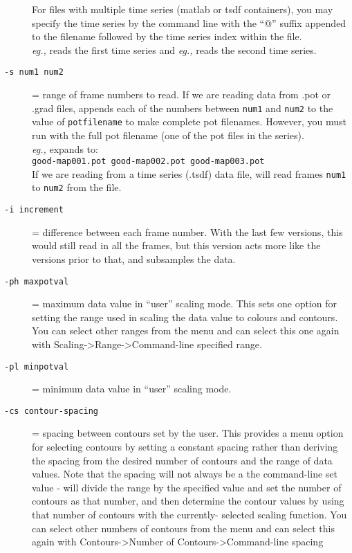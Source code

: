 \begin{description}
    For files with multiple time series (matlab or tsdf containers),
    you may specify the time series by the command line with the ``@'' 
    suffix appended to the filename followed by the time series index 
    within the file. \\

    {\em eg.,} \hspace{.2in}{\tt -p file.mat@1} reads the first time
    series and 
    {\em eg.,} \hspace{.2in}{\tt -p file.tsdfc@2} reads the second time
    series.
    
  \item[{\tt -s num1 num2}] = range of frame numbers to read.  If we are
    reading data from .pot or .grad files, \map{} appends each of the
    numbers between \texttt{num1} and \texttt{num2} 
    to the value of {\tt potfilename} to make complete pot filenames.
    However, you must run \map{} with the full pot filename (one of the 
    pot files in the series). \\ 
    {\em eg.,} \hspace{.2in}{\tt -p good-map001.pot -s 1 3}\hspace{.2in}
    expands to:\\
    \mbox{\hspace{1in}}
    {\tt good-map001.pot good-map002.pot good-map003.pot}\\
    If we are reading from a time series (.tsdf) data file, \map{} will
    read frames {\tt num1} to {\tt num2} from the file.
    
  \item[{\tt-i increment}] = difference between each frame number.
    With the last few versions, this would still read in all the frames, but
    this version acts more like the versions prior to that, and subsamples
    the data.  
    
  \item[{\tt-ph maxpotval}] = maximum data value in ``user'' scaling
    mode.  This sets one option for setting the range used in 
    scaling the data value to colours and contours.  You can select other
    ranges from the menu and can select this one again with
    Scaling->Range->Command-line specified range. 
    
  \item[{\tt-pl minpotval}]
    = minimum data value in ``user'' scaling mode. 
    
  \item[{\tt-cs contour-spacing}] = spacing between contours set by the
    user.  This provides a menu option for selecting contours by setting a
    constant spacing rather than deriving the spacing from the desired
    number of contours and the range of data values.  Note that the spacing
    will not always be a the command-line set value - \map{} will divide
    the range by the specified value and set the number of contours as that
    number, and then determine the contour values by using that number of
    contours with the currently- selected scaling function.  You can select
    other numbers of contours from the menu and can select this again with
    Contours->Number of Contours->Command-line spacing
    

\end{description}
